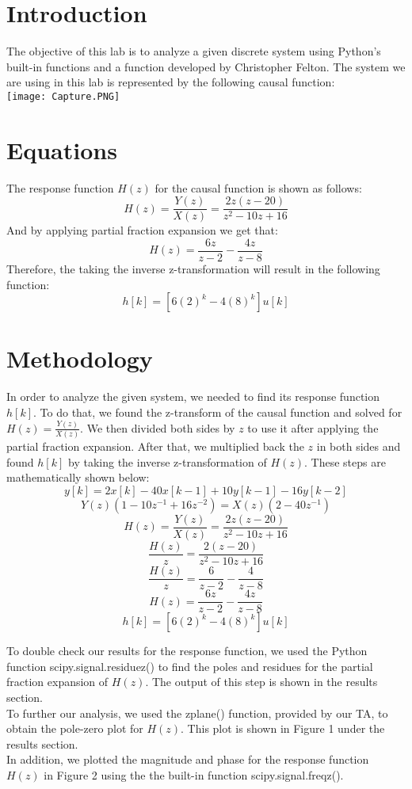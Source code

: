\documentclass[12pt]{report}
\begin{document}
\section{Introduction}
The objective of this lab is to analyze a given discrete system using Python’s built-in functions and a function developed by Christopher Felton. The system we are using in this lab is represented by the following causal function:\\
\texttt{[image: Capture.PNG]}

\section{Equations}
The response function $H(z)$ for the causal function is shown as follows:\\
$$H(z)=\frac{Y(z)}{X(z)}=\frac{2z(z-20)}{z^2-10z+16}$$
And by applying partial fraction expansion we get that:\\
$$H(z)=\frac{6z}{z-2}-\frac{4z}{z-8}$$
Therefore, the taking the inverse z-transformation will result in the following function:\\
$$h[k]=[6(2)^k-4(8)^k]u[k]$$


\section{Methodology}
In order to analyze the given system, we needed to find its response function $h[k]$. To do that, we found the z-transform of the causal function and solved for $H(z)=\frac{Y(z)}{X(z)}$. We then divided both sides by $z$ to use it after applying the partial fraction expansion. After that, we multiplied back the $z$ in both sides and found $h[k]$ by taking the inverse z-transformation of $H(z)$. These steps are mathematically shown below:\\
$$y[k]=2x[k]-40x[k-1]+10y[k-1]-16y[k-2]$$
$$Y(z)(1-10z^{-1}+16z^{-2})=X(z)(2-40z^{-1})$$
$$H(z)=\frac{Y(z)}{X(z)}=\frac{2z(z-20)}{z^2-10z+16}$$
$$\frac{H(z)}{z}=\frac{2(z-20)}{z^2-10z+16}$$
$$\frac{H(z)}{z}=\frac{6}{z-2}-\frac{4}{z-8}$$
$$H(z)=\frac{6z}{z-2}-\frac{4z}{z-8}$$
$$h[k]=[6(2)^k-4(8)^k]u[k]$$

To double check our results for the response function, we used the Python function scipy.signal.residuez() to find the poles and residues for the partial fraction expansion of $H(z)$. The output of this step is shown in the results section.\\

To further our analysis, we used the zplane() function, provided by our TA, to obtain the pole-zero plot for $H(z)$. This plot is shown in Figure 1 under the results section.\\
In addition, we plotted the magnitude and phase for the response function $H(z)$ in Figure 2 using the the built-in function scipy.signal.freqz().
\end{document}
